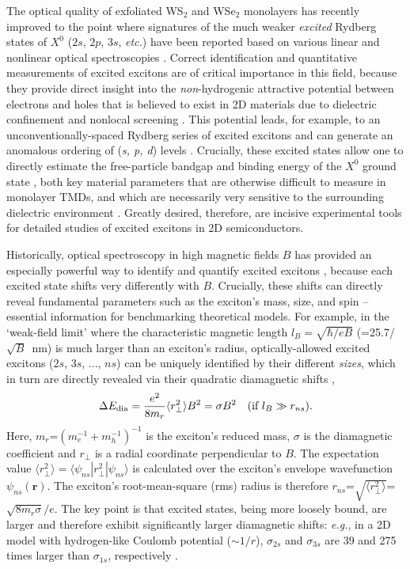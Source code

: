 \documentclass[aps,prl,twocolumn]{revtex4-1}
\begin{document}
The optical quality of exfoliated WS$_2$ and WSe$_2$ monolayers has recently improved to the point where signatures of the much weaker \emph{excited} Rydberg states of $X^0$ ($2s$, $2p$, $3s$, \emph{etc.}) have been reported based on various linear and nonlinear optical spectroscopies \cite{He, Ye, Chernikov, Zhu, Wang1, Hill, Stroucken}. Correct identification and quantitative measurements of excited excitons are of critical importance in this field, because they provide direct insight into the \emph{non}-hydrogenic attractive potential between electrons and holes that is believed to exist in 2D materials due to dielectric confinement and nonlocal screening \cite{Keldysh, Cudazzo, Berkelbach, Macdonald, Kyla}. This potential leads, for example, to an unconventionally-spaced Rydberg series of excited excitons and can generate an anomalous ordering of (\textit{s, p, d}) levels \cite{Ye}. Crucially, these excited states allow one to directly estimate the free-particle bandgap and binding energy of the $X^0$ ground state \cite{He, Ye, Chernikov, Zhu, Wang1, Hill}, both key material parameters that are otherwise difficult to measure in monolayer TMDs, and which are necessarily very sensitive to the surrounding dielectric environment \cite{Kyla, Latini, Stier_Nano, Raja}. Greatly desired, therefore, are incisive experimental tools for detailed studies of excited excitons in 2D semiconductors.

Historically, optical spectroscopy in high magnetic fields $B$ has provided an especially powerful way to identify and quantify excited excitons \cite{Miura, Knox, Hasegawa, Ritchie, Edelstein}, because each excited state shifts very differently with $B$. Crucially, these shifts can directly reveal fundamental parameters such as the exciton's mass, size, and spin -- essential information for benchmarking theoretical models.  For example, in the `weak-field limit' where the characteristic magnetic length $l_B = \sqrt{\hbar / eB}$ (=25.7/$\sqrt{B}$~nm) is much larger than an exciton's radius, optically-allowed excited excitons ($2s$, $3s$, ..., $ns$) can be uniquely identified by their different \textit{sizes}, which in turn are directly revealed via their quadratic diamagnetic shifts \cite{Miura, Knox, Stier_NatComm},
\begin{equation}
\Delta E_{\rm dia} = \frac{e^2}{8m_r} \langle r_\perp^2 \rangle B^2 = \sigma B^2 ~~ \textrm{    (if } l_B \gg r_{ns}).
\end{equation}
Here, $m_r$=$(m_e^{-1} + m_h^{-1})^{-1}$ is the exciton's reduced mass, $\sigma$ is the diamagnetic coefficient and $r_\perp$ is a radial coordinate perpendicular to $B$. The expectation value $\langle r_\perp^2 \rangle = \langle \psi_{ns} | r_\perp^2 | \psi_{ns} \rangle$ is calculated over the exciton's envelope wavefunction $\psi_{ns} (\textbf{r})$. The exciton's root-mean-square (rms) radius is therefore $r_{ns}$=$\sqrt{\langle r_\perp^2 \rangle}$=$\sqrt{8m_r \sigma}/e$. The key point is that excited states, being more loosely bound, are larger and therefore exhibit significantly larger diamagnetic shifts: \textit{e.g.}, in a 2D model with hydrogen-like Coulomb potential ($\sim$$1/r$), $\sigma_{2s}$ and $\sigma_{3s}$ are 39 and 275 times larger than $\sigma_{1s}$, respectively \cite{Ritchie}.
\end{document}
